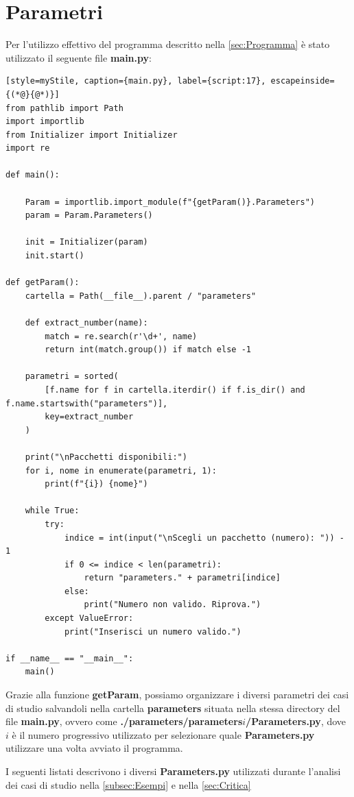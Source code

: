 \section{Parametri}
\label{sec:Parametri}

Per l'utilizzo effettivo del programma descritto nella \autoref{sec:Programma} è stato utilizzato il seguente file \textbf{main.py}:

\begin{lstlisting}[style=myStile, caption={main.py}, label={script:17}, escapeinside={(*@}{@*)}]
from pathlib import Path
import importlib
from Initializer import Initializer
import re

def main():
    
    Param = importlib.import_module(f"{getParam()}.Parameters")
    param = Param.Parameters()
    
    init = Initializer(param)
    init.start()

def getParam():
    cartella = Path(__file__).parent / "parameters"

    def extract_number(name):
        match = re.search(r'\d+', name)
        return int(match.group()) if match else -1

    parametri = sorted(
        [f.name for f in cartella.iterdir() if f.is_dir() and f.name.startswith("parameters")],
        key=extract_number
    )

    print("\nPacchetti disponibili:")
    for i, nome in enumerate(parametri, 1):
        print(f"{i}) {nome}")

    while True:
        try:
            indice = int(input("\nScegli un pacchetto (numero): ")) - 1
            if 0 <= indice < len(parametri):
                return "parameters." + parametri[indice]
            else:
                print("Numero non valido. Riprova.")
        except ValueError:
            print("Inserisci un numero valido.")

if __name__ == "__main__":
    main()
\end{lstlisting}

Grazie alla funzione \textbf{getParam}, possiamo organizzare i diversi parametri dei casi di studio salvandoli nella cartella \textbf{parameters}
situata nella stessa directory del file \textbf{main.py}, ovvero come \textbf{./parameters/parameters$i$/Parameters.py}, dove $i$ è il numero progressivo 
utilizzato per selezionare quale \textbf{Parameters.py} utilizzare una volta avviato il programma.

I seguenti listati descrivono i diversi \textbf{Parameters.py} utilizzati durante l'analisi dei casi di studio nella \autoref{subsec:Esempi} e nella
\autoref{sec:Critica}

